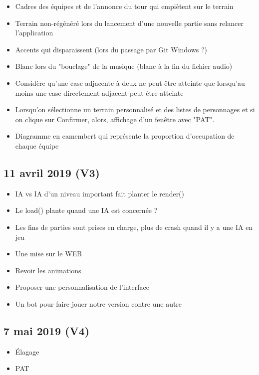 \documentclass[11pt,a4paper]{article}
\begin{document}
%
\begin{itemize}[label=\CheckmarkBold, font=\color{rouge}]

\end{itemize}
%
\begin{itemize}[label=\CheckmarkBold, font=\color{vert}]
    \item Cadres des équipes et de l'annonce du tour qui empiètent sur le terrain
    \item Terrain non-régénéré lors du lancement d'une nouvelle partie sans relancer l'application
    \item Accents qui disparaissent (lors du passage par Git Windows ?)
    \item Blanc lors du "bouclage" de la musique (blanc à la fin du fichier audio)
    \item Considère qu'une case adjacente à deux ne peut être atteinte que lorsqu'au moins une case directement adjacent peut être atteinte
    \item Lorsqu'on sélectionne un terrain personnalisé et des listes de personnages et si on clique sur Confirmer, alors, affichage d'un fenêtre avec "PAT".
\end{itemize}
%
\begin{itemize}[label=\Peace, font=\large \color{vert}]
      \item Diagramme en camembert qui représente la proportion d'occupation de chaque équipe
\end{itemize}

\subsection{11 avril 2019 (V3)}

%
\begin{itemize}[label=\CheckmarkBold, font=\color{rouge}]
\end{itemize}
%
\begin{itemize}[label=\CheckmarkBold, font=\color{vert}]
    \item IA vs IA d'un niveau important fait planter le render()
    \item Le load() plante quand une IA est concernée ?
    \item Les fins de parties sont prises en charge, plus de crash quand il y a une IA en jeu
\end{itemize}
%
\begin{itemize}[label=\Peace, font=\large \color{red}]
    \item Une mise sur le WEB
    \item Revoir les animations
    \item Proposer une personnalisation de l'interface
    \item Un bot pour faire jouer notre version contre une autre
\end{itemize}


\subsection{7 mai 2019 (V4)}

%
\begin{itemize}[label=\CheckmarkBold, font=\color{vert}]
    \item Élagage
    \item PAT    
\end{itemize}
\end{document}
